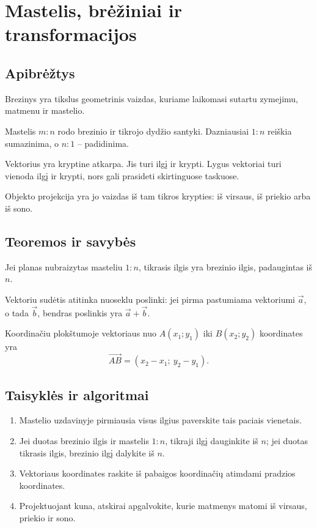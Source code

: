 \section{Mastelis, brėžiniai ir transformacijos}\label{sec:mastelis-breziniai-ir-transformacijos}

\subsection{Apibrėžtys}
\begin{apibreztis}
Brezinys yra tikslus geometrinis vaizdas, kuriame laikomasi sutartu zymejimu, matmenu ir mastelio.
\end{apibreztis}
\begin{apibreztis}
Mastelis $m:n$ rodo brezinio ir tikrojo dydžio santyki. Dazniausiai $1:n$ reiškia sumazinima, o $n:1$ -- padidinima.
\end{apibreztis}
\begin{apibreztis}
Vektorius yra kryptine atkarpa. Jis turi ilgį ir krypti. Lygus vektoriai turi vienoda ilgį ir krypti, nors gali prasideti skirtinguose taskuose.
\end{apibreztis}
\begin{apibreztis}
Objekto projekcija yra jo vaizdas iš tam tikros krypties: iš virsaus, iš priekio arba iš sono.
\end{apibreztis}

\subsection{Teoremos ir savybės}
\begin{savybe}
Jei planas nubraizytas masteliu $1:n$, tikrasis ilgis yra brezinio ilgis, padaugintas iš $n$.
\end{savybe}
\begin{savybe}
Vektoriu sudėtis atitinka nuoseklu poslinki: jei pirma pastumiama vektoriumi $\vec a$, o tada $\vec b$, bendras poslinkis yra $\vec a+\vec b$.
\end{savybe}
\begin{savybe}
Koordinačiu plokštumoje vektoriaus nuo $A(x_1;y_1)$ iki $B(x_2;y_2)$ koordinates yra
\[
\overrightarrow{AB}=(x_2-x_1;\ y_2-y_1).
\]
\end{savybe}

\subsection{Taisyklės ir algoritmai}
\begin{enumerate}[label=\arabic*.]
\item Mastelio uzdavinyje pirmiausia visus ilgius paverskite tais paciais vienetais.
\item Jei duotas brezinio ilgis ir mastelis $1:n$, tikraji ilgį dauginkite iš $n$; jei duotas tikrasis ilgis, brezinio ilgį dalykite iš $n$.
\item Vektoriaus koordinates raskite iš pabaigos koordinačių atimdami pradzios koordinates.
\item Projektuojant kuna, atskirai apgalvokite, kurie matmenys matomi iš virsaus, priekio ir sono.
\end{enumerate}
